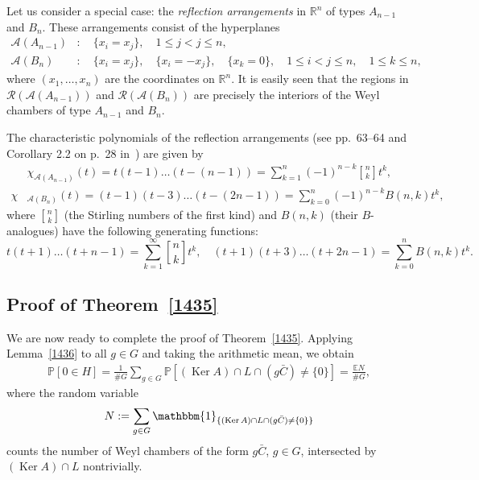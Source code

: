\documentclass[12pt, reqno]{amsart}
\theoremstyle{plain}
\theoremstyle{definition}
\theoremstyle{remark}
\begin{document}
Let us consider a special case: the \emph{reflection arrangements} in ${\mathbb{R}}^n$ of types $A_{n-1}$ and $B_n$.
These arrangements consist  of the hyperplanes
\begin{align}
{\mathcal{A}}(A_{n-1})&\colon \quad  \{x_i = x_j\}, \quad 1\leq j < j \leq n, \label{eq:arr_A}\\
{\mathcal{A}}(B_n)&\colon \quad \{x_i = x_j\}, \quad \{x_i = -x_j\}, \quad \{x_k = 0\}, \quad 1\leq i < j \leq n, \quad 1\leq k\leq n, \label{eq:arr_B}
\end{align}
where $(x_1,\ldots,x_n)$ are the coordinates on ${\mathbb{R}}^n$.
It is easily seen that the regions in ${\mathcal{R}}({\mathcal{A}}(A_{n-1}))$ and ${\mathcal{R}}({\mathcal{A}}(B_n))$ are precisely the interiors of the Weyl chambers of type $A_{n-1}$ and $B_n$.

The characteristic polynomials of the reflection arrangements (see pp.~63--64 and Corollary 2.2 on p.~28 in~\cite{rS07}) are given by
\begin{align}
&\chi_{{\mathcal{A}}(A_{n-1})}(t) = t (t-1) \ldots (t-(n-1))= \sum_{k=1}^{n} (-1)^{n-k} {\genfrac{[}{]}{0pt}{}{{n}}{{k}}} t^k,  \label{eq:chi_A} \\
\chi&_{{\mathcal{A}}(B_{n})}(t) = (t-1)(t-3)\ldots (t-(2n-1)) = \sum_{k=0}^{n} (-1)^{n-k} B(n,k)t^k, \label{eq:chi_B}
\end{align}
where ${\genfrac{[}{]}{0pt}{}{{n}}{{k}}}$ (the Stirling numbers of the first kind) and $B(n,k)$ (their $B$-analogues) have the following generating functions:
\begin{equation*}
t(t+1) \ldots (t+n-1) = \sum_{k=1}^\infty {\genfrac{[}{]}{0pt}{}{{n}}{{k}}} t^k,
\quad
(t+1)(t+3)\ldots (t+2n-1) = \sum_{k=0}^n B(n,k) t^k.
\end{equation*}

\subsection{Proof of Theorem~\ref{1435}}
We are now ready to complete the proof of Theorem~\ref{1435}. Applying Lemma~\ref{1436} to all $g\in G$ and taking the arithmetic mean, we obtain
\begin{align}\label{eq:reduction}
{\mathbb{P}}[0\in H]
=
\frac 1 {\# G} \sum_{g\in G} {\mathbb{P}}[(\operatorname*{Ker} A) \cap L \cap (g\bar C) \neq \{0\}]
=
\frac {{\mathbb E} N} {\# G} ,
\end{align}
where the random variable
\begin{equation} \label{eq:N=}
N := \sum_{g\in G} {\mathbbm{1}}_{\{(\operatorname*{Ker} A) \cap L\cap  (g\bar C) \neq \{0\}\}}
\end{equation}
counts the number of Weyl chambers of the form $g\bar C$, $g\in G$, intersected by  $(\operatorname*{Ker} A)\cap L$ nontrivially.
\end{document}
